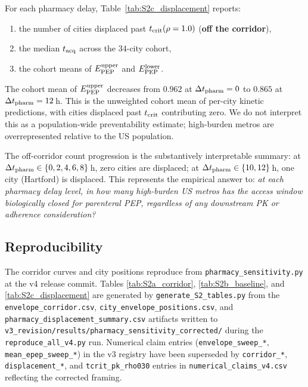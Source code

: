 \documentclass[11pt]{article}
\theoremstyle{definition}
\theoremstyle{remark}
\begin{document}
For each pharmacy delay, Table~\ref{tab:S2c_displacement} reports:
\begin{enumerate}
  \item the number of cities displaced past $t_{\rm crit}(\rho=1.0)$
        (\textbf{off the corridor}),
  \item the median $t_{\rm acq}$ across the 34-city cohort,
  \item the cohort means of $E_{\rm PEP}^{\rm upper}$ and
        $E_{\rm PEP}^{\rm lower}$.
\end{enumerate}
The cohort mean of $E_{\rm PEP}^{\rm upper}$ decreases from $0.962$ at
$\Delta t_{\rm pharm} = 0$ to $0.865$ at $\Delta t_{\rm pharm} = 12$\,h.
This is the unweighted cohort mean of per-city kinetic predictions, with
cities displaced past $t_{\rm crit}$ contributing zero.  We do not
interpret this as a population-wide preventability estimate;
high-burden metros are overrepresented relative to the US population.

The off-corridor count progression is the substantively interpretable
summary: at $\Delta t_{\rm pharm} \in \{0, 2, 4, 6, 8\}$\,h, zero cities
are displaced; at $\Delta t_{\rm pharm} \in \{10, 12\}$\,h, one city
(Hartford) is displaced.  This represents the empirical answer to:
\emph{at each pharmacy delay level, in how many high-burden US metros
has the access window biologically closed for parenteral PEP, regardless
of any downstream PK or adherence consideration?}



\subsection{Reproducibility}
\label{sec:S2_reproducibility}

The corridor curves and city positions reproduce from
\texttt{pharmacy\_sensitivity.py} at the v4 release commit.  Tables
\ref{tab:S2a_corridor}, \ref{tab:S2b_baseline}, and
\ref{tab:S2c_displacement} are generated by
\texttt{generate\_S2\_tables.py} from the
\texttt{envelope\_corridor.csv}, \texttt{city\_envelope\_positions.csv},
and \texttt{pharmacy\_displacement\_summary.csv} artifacts written to
\texttt{v3\_revision/results/pharmacy\_sensitivity\_corrected/} during
the \texttt{reproduce\_all\_v4.py} run.  Numerical claim entries
(\texttt{envelope\_sweep\_*}, \texttt{mean\_epep\_sweep\_*}) in the
v3 registry have been superseded by \texttt{corridor\_*},
\texttt{displacement\_*}, and \texttt{tcrit\_pk\_rho030} entries in
\texttt{numerical\_claims\_v4.csv} reflecting the corrected framing.


\end{document}
